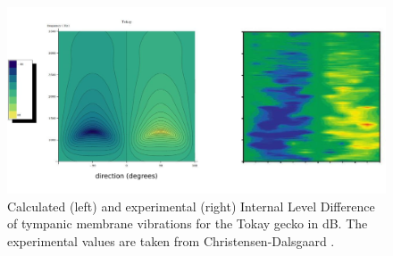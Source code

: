 \begin{figure}[ht!]
 \centering
 \includegraphics[width=1.0\linewidth]{Diagrams/Plots/iLD/tokayiLDboth.png}
 \caption[ILD plots for the Tokay gecko]{Calculated (left) and experimental (right) Internal Level Difference of tympanic membrane vibrations for the Tokay gecko
 in dB. The experimental values are taken from Christensen-Dalsgaard \cite{dalsgaardmanley1}.}
  \label{tokayilDboth}
\end{figure}

